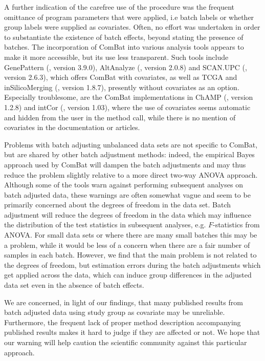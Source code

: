 \documentclass{bio}
\begin{document}
A further indication of the carefree use of the procedure was the frequent omittance of program parameters that were applied, i.e batch labels or whether group labels were supplied as covariates. Often, no effort was undertaken in order to substantiate the existence of batch effects, beyond stating the presence of batches. The incorporation of ComBat into various analysis tools appears to make it more accessible, but its use less transparent. Such tools include GenePattern (\citealp{Reich2006}, version 3.9.0), AltAnalyze (\citealp{Emig2010}, version 2.0.8) and SCAN.UPC (\citealp{Piccolo2013}, version 2.6.3), which offers ComBat with covariates, as well as TCGA and  inSilicoMerging (\citealp{ Taminau2012}, version 1.8.7), presently without covariates as an option. Especially troublesome, are the ComBat implementations in ChAMP (\citealp{Morris2014}, version 1.2.8) and intCor (\citealp{Fernandez-Albert2014}, version 1.03), where the use of covariates seems automatic and hidden from the user in the method call, while there is no mention of covariates in the documentation or articles.

Problems with batch adjusting unbalanced data sets are not specific to ComBat, but are shared by other batch adjustment methods: indeed, the empirical Bayes approach used by ComBat  will dampen the batch adjustments and may thus reduce the problem slightly relative to a more direct two-way ANOVA approach. Although some of the tools warn against performing subsequent analyses on batch adjusted data, these warnings are often somewhat vague and seem to be primarily concerned about the degrees of freedom in the data set. Batch adjustment will reduce the degrees of freedom in the data which may influence the distribution of the test statistics in subsequent analyses, e.g. $F$-statistics from ANOVA. For small data sets or where there are many small batches this may be a problem, while it would be less of a concern when there are a fair number of samples in each batch. However, we find that the main problem is not related to the degrees of freedom, but estimation errors during the batch adjustments which get applied across the data, which can induce group differences in the adjusted data set even in the absence of batch effects.

We are concerned, in light of our findings, that many published results from batch adjusted data using study group as covariate may be unreliable. Furthermore, the frequent lack of proper method description accompanying published results makes it hard to judge if they are affected or not. We hope that our warning will help caution the scientific community against this particular approach.
\end{document}
